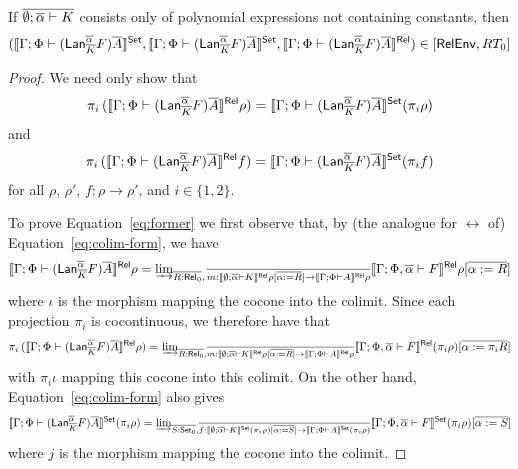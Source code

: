 \documentclass{lmcs}
\theoremstyle{plain}\newtheorem{satz}[thm]{Satz}
\newcommand{\set}{\mathsf{Set}}
\begin{document}
\begin{prop}
If $\overline{\emptyset; \overline{\alpha} \vdash K}$ consists only of
polynomial expressions not containing constants, then
\[(\setsem{ \Gamma; \Phi \vdash (\Lan^{\ol \alpha}_{\ol{K}} F)\ol{A}
}, \setsem{ \Gamma; \Phi \vdash (\Lan^{\ol \alpha}_{\ol{K}} F)\ol{A} },
\relsem{ \Gamma; \Phi \vdash (\Lan^{\ol \alpha}_{\ol{K}} F)\ol{A} }) \in
[\relenv,RT_0]\]
\end{prop}
\begin{proof}
We need only show that
\begin{equation}\label{eq:former}
\pi_i \,( \relsem{ \Gamma; \Phi \vdash (\Lan^{\ol \alpha}_{\ol{K}} F)\ol{A}
} \rho ) = \setsem{ \Gamma; \Phi \vdash (\Lan^{\ol \alpha}_{\ol{K}}
  F)\ol{A} } (\pi_i \rho)
\end{equation}
and
\begin{equation}\label{eq:latter}
\pi_i \,( \relsem{ \Gamma; \Phi \vdash (\Lan^{\ol \alpha}_{\ol{K}} F)\ol{A}
} f ) = \setsem{ \Gamma; \Phi \vdash (\Lan^{\ol \alpha}_{\ol{K}}
  F)\ol{A} } (\pi_i f)
\end{equation}
for all $\rho$, $\rho'$, $f : \rho \to \rho'$, and $i \in \{1, 2\}$.

To prove Equation~\ref{eq:former} we first observe that, by (the
analogue for $\rel$ of) Equation~\ref{eq:colim-form}, we have
\[
\llbracket{ \Gamma; \Phi \vdash (\mathsf{Lan}^{\overline{\alpha}}_{\overline{K}} F)\overline{A} }\rrbracket^{\mathsf{Rel}} \rho =
{{\underrightarrow{\lim}}_{\overline{R : \mathsf{Rel}_0},\, \overline{m : \llbracket{ \emptyset; \overline{\alpha} \vdash K }\rrbracket^{\mathsf{Rel}}
    \rho[\overline{\alpha := R}] \to \llbracket{ \Gamma; \Phi \vdash A }\rrbracket^{\mathsf{Rel}}
    \rho}}{ \llbracket{ \Gamma; \Phi, \overline{\alpha} \vdash F }\rrbracket^{\mathsf{Rel}}
  \rho[\overline{\alpha := R}] }}
\]
where $\iota$ is the morphism mapping the cocone into the colimit.
Since each projection $\pi_i$ is cocontinuous, we therefore have that 
\[
\pi_i\, ( \llbracket{ \Gamma; \Phi \vdash (\mathsf{Lan}^{\overline{\alpha}}_{\overline{K}}
  F)\overline{A} }\rrbracket^{\mathsf{Rel}} \rho ) = {{\underrightarrow{\lim}}_{\overline{R : \mathsf{Rel}_0}, \overline{m : \llbracket{
      \emptyset; \overline{\alpha} \vdash K }\rrbracket^{\mathsf{Rel}} \rho[\overline{\alpha := R}] \to
    \llbracket{ \Gamma; \Phi \vdash A }\rrbracket^{\mathsf{Rel}} \rho}}{ \llbracket{ \Gamma; \Phi,
    \overline{\alpha} \vdash F }\rrbracket^{\mathsf{Rel}} (\pi_i \rho) [\overline{\alpha := \pi_i R}]}}
\]
with $\pi_i \iota$ mapping this cocone into this colimit.  On the
other hand, Equation~\ref{eq:colim-form} also gives
\[
\setsem{ \Gamma; \Phi \vdash (\Lan^{\ol \alpha}_{\ol{K}} F)\ol{A} }
(\pi_i \rho) = \colim{\ol{S : \set_0}, \ol{f : \setsem{ \emptyset;
      \ol\alpha \vdash K } (\pi_i \rho)[\ol{\alpha := S}] \to \setsem{
      \Gamma; \Phi \vdash A } (\pi_i \rho)}}{ \setsem{ \Gamma; \Phi,
    \ol\alpha \vdash F } (\pi_i \rho) [\ol{\alpha := S}]}
\]
where $j$ is the morphism mapping the cocone into the colimit.


\end{proof}
\end{document}
